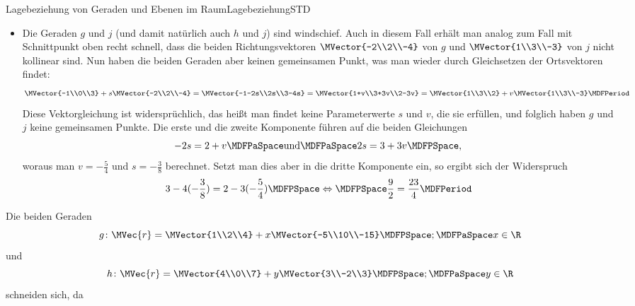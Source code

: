 \begin{MXContent}{Lagebeziehung von Geraden und Ebenen im Raum}{Lagebeziehung}{STD}
\begin{MExample}
\begin{itemize}
\item Die Geraden $g$ und $j$ (und damit natürlich auch $h$ und $j$) sind windschief. Auch in diesem Fall erhält man analog zum Fall mit Schnittpunkt oben recht schnell, dass die beiden Richtungsvektoren $\MVector{-2\\2\\-4}$ von $g$ und $\MVector{1\\3\\-3}$ von $j$ nicht kollinear sind. Nun haben die beiden Geraden aber keinen gemeinsamen Punkt, was man wieder durch Gleichsetzen der Ortsvektoren findet:
\[
 \MVector{-1\\0\\3}+s\MVector{-2\\2\\-4}=\MVector{-1-2s\\2s\\3-4s}=\MVector{1+v\\3+3v\\2-3v}=\MVector{1\\3\\2}+v\MVector{1\\3\\-3}\MDFPeriod
\]
Diese Vektorgleichung ist widersprüchlich, das heißt man findet keine Parameterwerte $s$ und $v$, die sie erfüllen, und folglich haben $g$ und $j$ keine gemeinsamen Punkte. Die erste und die zweite Komponente führen auf die beiden Gleichungen
\[
 -2s=2+v\MDFPaSpace\textrm{und}\MDFPaSpace 2s=3+3v \MDFPSpace,
\]
woraus man $v=-\frac{5}{4}$ und $s=-\frac{3}{8}$ berechnet. Setzt man dies aber in die dritte Komponente ein, so ergibt sich der Widerspruch
\[
 3-4(-\frac{3}{8})=2-3(-\frac{5}{4})\MDFPSpace\Leftrightarrow\MDFPSpace \frac{9}{2}=\frac{23}{4} \MDFPeriod
\]

\end{itemize}

\end{MExample}

\begin{MExercise}
Die beiden Geraden 
\[
 g\colon\MVec{r}=\MVector{1\\2\\4}+x\MVector{-5\\10\\-15}\MDFPSpace;\MDFPaSpace x\in\R
\]
und
\[
 h\colon\MVec{r}=\MVector{4\\0\\7}+y\MVector{3\\-2\\3} \MDFPSpace;\MDFPaSpace y\in\R
\]
schneiden sich, da 


\end{MExercise}
\end{MXContent}
